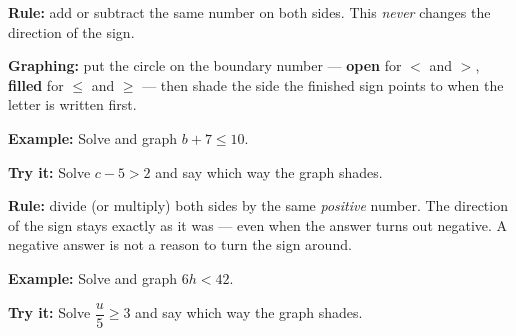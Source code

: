 \documentclass[12pt]{article}
\begin{document}


\begin{formulabox}
\textbf{Rule:} add or subtract the same number on both sides. This \emph{never}
changes the direction of the sign.\par
\textbf{Graphing:} put the circle on the boundary number --- \textbf{open} for
$<$ and $>$, \textbf{filled} for $\le$ and $\ge$ --- then shade the side the
finished sign points to when the letter is written first.
\end{formulabox}

\begin{examplebox}
\textbf{Example:} \quad Solve and graph $b + 7 \le 10$.
\end{examplebox}

\begin{tryitbox}
\textbf{Try it:} \quad Solve $c - 5 > 2$ and say which way the graph
shades.\\[2pt]
\end{tryitbox}


\begin{formulabox}
\textbf{Rule:} divide (or multiply) both sides by the same \emph{positive}
number. The direction of the sign stays exactly as it was --- even when the
answer turns out negative. A negative answer is not a reason to turn the sign
around.
\end{formulabox}

\begin{examplebox}
\textbf{Example:} \quad Solve and graph $6h < 42$.
\end{examplebox}

\begin{tryitbox}
\textbf{Try it:} \quad Solve $\dfrac{u}{5} \ge 3$ and say which way the graph
shades.\\[2pt]
\end{tryitbox}
\end{document}
